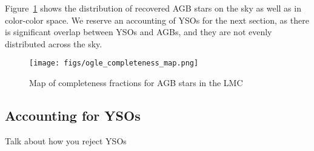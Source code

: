 Figure~\ref{fig:lmc_completeness} shows the distribution of recovered AGB stars on the sky as well as in color-color space. We reserve an accounting of YSOs for the next section, as there is significant overlap between YSOs and AGBs, and they are not evenly distributed across the sky.

\begin{figure}[h]
\texttt{[image: figs/ogle\_completeness\_map.png]}
\caption{Map of completeness fractions for AGB stars in the LMC \label{fig:lmc_completeness}}
\end{figure}

\subsection{Accounting for YSOs}
{\color{red}Talk about how you reject YSOs}


